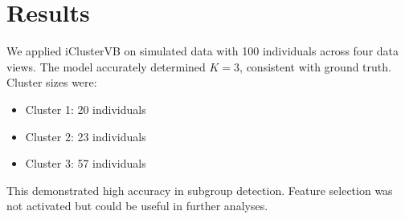 \section{Results}
We applied iClusterVB on simulated data with 100 individuals across four data views. The model accurately determined $K=3$, consistent with ground truth. Cluster sizes were:
\begin{itemize}
  \item Cluster 1: 20 individuals
  \item Cluster 2: 23 individuals
  \item Cluster 3: 57 individuals
\end{itemize}

This demonstrated high accuracy in subgroup detection. Feature selection was not activated but could be useful in further analyses.
